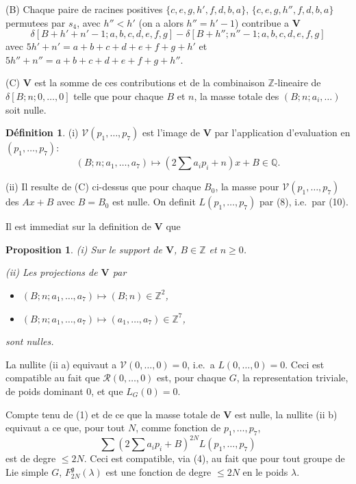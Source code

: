 \documentclass[11pt,a4paper]{article}
\theoremstyle{plain}
\newtheorem{proposition}[theorem]{Proposition}
\theoremstyle{definition}
\newtheorem{definition}[theorem]{D\'efinition}
\begin{document}
\smallskip

(B) Chaque paire de racines positives $\{c, e, g, h', f, d, b, a\}$, $\{c, e, g, h'', f, d, b, a\}$ permutees par $s_4$, avec $h'' < h'$ (on a alors $h'' = h' - 1$) contribue a $\mathbf{V}$
\[
\delta[B+h'+n'-1; a,b,c,d,e,f,g] - \delta[B+h''; n''-1; a,b,c,d,e,f,g]
\]
avec $5h' + n' = a + b + c + d + e + f + g + h'$ et $5h'' + n'' = a + b + c + d + e + f + g + h''$.

\smallskip

(C) $\mathbf{V}$ est la somme de ces contributions et de la combinaison $\mathbb{Z}$-lineaire de $\delta[B; n; 0,\dots,0]$ telle que pour chaque $B$ et $n$, la masse totale des $(B; n; a_i,\dots)$ soit nulle.

\begin{definition}
(i) $\mathcal{V}(p_1,\dots,p_7)$ est l'image de $\mathbf{V}$ par l'application d'evaluation en $(p_1,\dots,p_7)$:
\[
(B; n; a_1,\dots,a_7) \mapsto (2\textstyle\sum a_i p_i + n)x + B \in \mathbb{Q}.
\]

(ii) Il resulte de (C) ci-dessus que pour chaque $B_0$, la masse pour $\mathcal{V}(p_1,\dots,p_7)$ des $Ax + B$ avec $B = B_0$ est nulle. On definit $L(p_1,\dots,p_7)$ par (8), i.e.\ par (10).
\end{definition}

Il est immediat sur la definition de $\mathbf{V}$ que

\begin{proposition}\label{prop:1}
\textup{(i)} Sur le support de $\mathbf{V}$, $B \in \mathbb{Z}$ et $n \geq 0$.

\textup{(ii)} Les projections de $\mathbf{V}$ par
\begin{itemize}
\item[(a)] $(B; n; a_1,\dots,a_7) \mapsto (B; n) \in \mathbb{Z}^2$,
\item[(b)] $(B; n; a_1,\dots,a_7) \mapsto (a_1,\dots,a_7) \in \mathbb{Z}^7$,
\end{itemize}
sont nulles.
\end{proposition}

La nullite (ii a) equivaut a $\mathcal{V}(0,\dots,0) = 0$, i.e.\ a $L(0,\dots,0) = 0$. Ceci est compatible au fait que $\mathcal{R}(0,\dots,0)$ est, pour chaque $G$, la representation triviale, de poids dominant $0$, et que $L_G(0) = 0$.

Compte tenu de (1) et de ce que la masse totale de $\mathbf{V}$ est nulle, la nullite (ii b) equivaut a ce que, pour tout $N$, comme fonction de $p_1,\dots,p_7$,
\[
\sum (2\textstyle\sum a_i p_i + B)^{2N} L(p_1,\dots,p_7)
\]
est de degre $\leq 2N$. Ceci est compatible, via (4), au fait que pour tout groupe de Lie simple $G$, $F_{2N}^{\mathfrak{g}}(\lambda)$ est une fonction de degre $\leq 2N$ en le poids $\lambda$.
\end{document}
